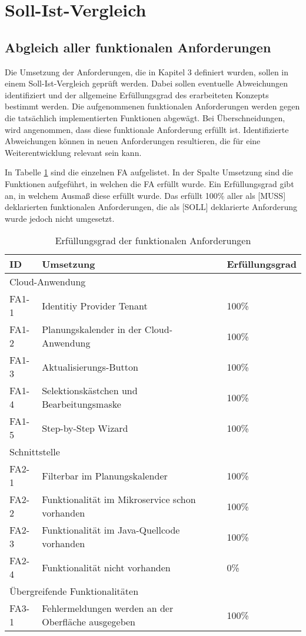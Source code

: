 \section{Soll-Ist-Vergleich}
\subsection{Abgleich aller funktionalen Anforderungen}
Die Umsetzung der Anforderungen, die in Kapitel 3 definiert wurden, sollen in einem Soll-Ist-Vergleich geprüft werden. Dabei sollen eventuelle Abweichungen identifiziert und der allgemeine Erfüllungsgrad des erarbeiteten Konzepts bestimmt werden. Die aufgenommenen funktionalen Anforderungen werden gegen die tatsächlich implementierten Funktionen abgewägt. Bei Überschneidungen, wird angenommen, dass diese funktionale Anforderung erfüllt ist. Identifizierte Abweichungen können in neuen Anforderungen resultieren, die für eine Weiterentwicklung relevant sein kann. 

In Tabelle \ref{tab:eval} sind die einzelnen \acs{FA} aufgelistet. In der Spalte Umsetzung sind die Funktionen aufgeführt, in welchen die \acs{FA} erfüllt wurde. Ein Erfüllungsgrad gibt an, in welchem Ausmaß diese erfüllt wurde. Das  erfüllt 100\% aller als [MUSS] deklarierten funktionalen Anforderungen, die als [SOLL] deklarierte Anforderung wurde jedoch nicht umgesetzt.

\begin{table}[H]
	\centering
	\begin{tabularx}{\textwidth}{|l X l|} 
		\hline
		ID    &   
		Umsetzung &
		Erfüllungsgrad \\ 
		\hline\hline
		\multicolumn{3}{|l|}{Cloud-Anwendung} \\
		\hline
		FA1-1 &   
		Identitiy Provider Tenant &
		100\% \\ 
		FA1-2 &   
		Planungskalender in der Cloud-Anwendung &
		100\% \\ 
		FA1-3 &   
		Aktualisierungs-Button &
		100\% \\
		FA1-4 &   
		Selektionskästchen und Bearbeitungsmaske &
		100\% \\
		FA1-5 &   
		Step-by-Step Wizard &
		100\% \\
		\hline\hline
		\multicolumn{3}{|l|}{Schnittstelle} \\
		\hline
		FA2-1 &   
		Filterbar im Planungskalender &
		100\%  \\ 
		FA2-2 &   
		Funktionalität im Mikroservice schon vorhanden &
		100\%  \\ 
		FA2-3 &   
		Funktionalität im Java-Quellcode vorhanden &
		100\%  \\ 
		FA2-4 &   
		Funktionalität nicht vorhanden &
		0\%  \\ 
		\hline\hline
		\multicolumn{3}{|l|}{Übergreifende Funktionalitäten} \\
		\hline
		FA3-1 &   
		Fehlermeldungen werden an der Oberfläche ausgegeben &
		100\%  \\ 
		\hline
	\end{tabularx}
	\caption{\label{tab:eval}Erfüllungsgrad der funktionalen Anforderungen}
\end{table}

